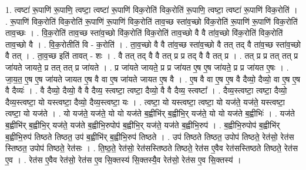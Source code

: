 \documentclass[17pt]{extarticle}
\begin{document}
1. त्वष्टा॑ रू॒पाणि॑ रू॒पाणि॒ त्वष्टा॒ त्वष्टा॑ रू॒पाणि॑ विक॒रोति॑ विक॒रोति॑ रू॒पाणि॒ त्वष्टा॒ त्वष्टा॑ रू॒पाणि॑ विक॒रोति॑ । . रू॒पाणि॑ विक॒रोति॑ विक॒रोति॑ रू॒पाणि॑ रू॒पाणि॑ विक॒रोति॑ ताव॒च्छ स्ता॑व॒च्छो वि॑क॒रोति॑ रू॒पाणि॑ रू॒पाणि॑ विक॒रोति॑ ताव॒च्छः । . वि॒क॒रोति॑ ताव॒च्छ स्ता॑व॒च्छो वि॑क॒रोति॑ विक॒रोति॑ ताव॒च्छो वै वै ता॑व॒च्छो वि॑क॒रोति॑ विक॒रोति॑ ताव॒च्छो वै । . वि॒क॒रोतीति॑ वि - क॒रोति॑ । . ता॒व॒च्छो वै वै ता॑व॒च्छ स्ता॑व॒च्छो वै तत् तद् वै ता॑व॒च्छ स्ता॑व॒च्छो वै तत् । . ता॒व॒च्छ इति॑ तावत् - शः । . वै तत् तद् वै वै तत् प्र प्र तद् वै वै तत् प्र । . तत् प्र प्र तत् तत् प्र जा॑यते जायते॒ प्र तत् तत् प्र जा॑यते । . प्र जा॑यते जायते॒ प्र प्र जा॑यत ए॒ष ए॒ष जा॑यते॒ प्र प्र जा॑यत ए॒षः । . जा॒य॒त॒ ए॒ष ए॒ष जा॑यते जायत ए॒ष वै वा ए॒ष जा॑यते जायत ए॒ष वै । . ए॒ष वै वा ए॒ष ए॒ष वै दैव्यो॒ दैव्यो॒ वा ए॒ष ए॒ष वै दैव्यः॑ । . वै दैव्यो॒ दैव्यो॒ वै वै दैव्य॒ स्त्वष्टा॒ त्वष्टा॒ दैव्यो॒ वै वै दैव्य॒ स्त्वष्टा᳚ । . दैव्य॒स्त्वष्टा॒ त्वष्टा॒ दैव्यो॒ दैव्य॒स्त्वष्टा॒ यो यस्त्वष्टा॒ दैव्यो॒ दैव्य॒स्त्वष्टा॒ यः । . त्वष्टा॒ यो यस्त्वष्टा॒ त्वष्टा॒ यो यज॑ते॒ यज॑ते॒ यस्त्वष्टा॒ त्वष्टा॒ यो यज॑ते । . यो यज॑ते॒ यज॑ते॒ यो यो यज॑ते ब॒ह्वीभि॑र् ब॒ह्वीभि॒र् यज॑ते॒ यो यो यज॑ते ब॒ह्वीभिः॑ । . यज॑ते ब॒ह्वीभि॑र् ब॒ह्वीभि॒र् यज॑ते॒ यज॑ते ब॒ह्वीभि॒रुपोप॑ ब॒ह्वीभि॒र् यज॑ते॒ यज॑ते ब॒ह्वीभि॒रुप॑ । . ब॒ह्वीभि॒रुपोप॑ ब॒ह्वीभि॑र् ब॒ह्वीभि॒रुप॑ तिष्ठते तिष्ठत॒ उप॑ ब॒ह्वीभि॑र् ब॒ह्वीभि॒रुप॑ तिष्ठते । . उप॑ तिष्ठते तिष्ठत॒ उपोप॑ तिष्ठते॒ रेत॑सो॒ रेत॑स स्तिष्ठत॒ उपोप॑ तिष्ठते॒ रेत॑सः । . ति॒ष्ठ॒ते॒ रेत॑सो॒ रेत॑सस्तिष्ठते तिष्ठते॒ रेत॑स ए॒वैव रेत॑सस्तिष्ठते तिष्ठते॒ रेत॑स ए॒व । . रेत॑स ए॒वैव रेत॑सो॒ रेत॑स ए॒व सि॒क्तस्य॑ सि॒क्तस्यै॒व रेत॑सो॒ रेत॑स ए॒व सि॒क्तस्य॑ । \newline
\end{document}
